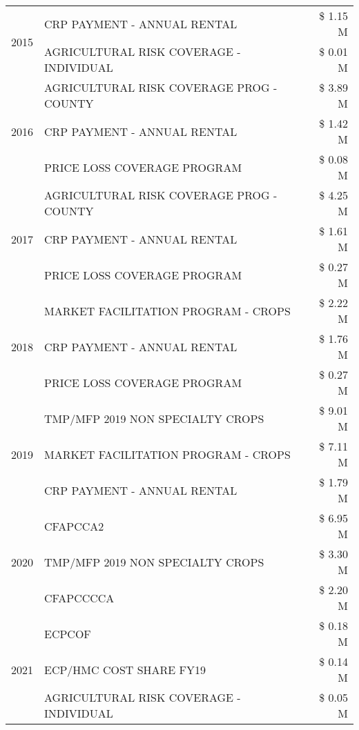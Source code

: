 \begin{tabular}{llr}
\cline{1-3}
\multirow[t]{2}{*}{2015} & CRP PAYMENT - ANNUAL RENTAL & \$ 1.15 M \\
 & AGRICULTURAL RISK COVERAGE - INDIVIDUAL & \$ 0.01 M \\
\cline{1-3}
\multirow[t]{3}{*}{2016} & AGRICULTURAL RISK COVERAGE PROG - COUNTY & \$ 3.89 M \\
 & CRP PAYMENT - ANNUAL RENTAL & \$ 1.42 M \\
 & PRICE LOSS COVERAGE PROGRAM & \$ 0.08 M \\
\cline{1-3}
\multirow[t]{3}{*}{2017} & AGRICULTURAL RISK COVERAGE PROG - COUNTY & \$ 4.25 M \\
 & CRP PAYMENT - ANNUAL RENTAL & \$ 1.61 M \\
 & PRICE LOSS COVERAGE PROGRAM & \$ 0.27 M \\
\cline{1-3}
\multirow[t]{3}{*}{2018} & MARKET FACILITATION PROGRAM - CROPS & \$ 2.22 M \\
 & CRP PAYMENT - ANNUAL RENTAL & \$ 1.76 M \\
 & PRICE LOSS COVERAGE PROGRAM & \$ 0.27 M \\
\cline{1-3}
\multirow[t]{3}{*}{2019} & TMP/MFP 2019 NON SPECIALTY CROPS & \$ 9.01 M \\
 & MARKET FACILITATION PROGRAM - CROPS & \$ 7.11 M \\
 & CRP PAYMENT - ANNUAL RENTAL & \$ 1.79 M \\
\cline{1-3}
\multirow[t]{3}{*}{2020} & CFAPCCA2 & \$ 6.95 M \\
 & TMP/MFP 2019 NON SPECIALTY CROPS & \$ 3.30 M \\
 & CFAPCCCCA & \$ 2.20 M \\
\cline{1-3}
\multirow[t]{3}{*}{2021} & ECPCOF & \$ 0.18 M \\
 & ECP/HMC COST SHARE FY19 & \$ 0.14 M \\
 & AGRICULTURAL RISK COVERAGE - INDIVIDUAL & \$ 0.05 M \\
\cline{1-3}
\bottomrule
\end{tabular}
